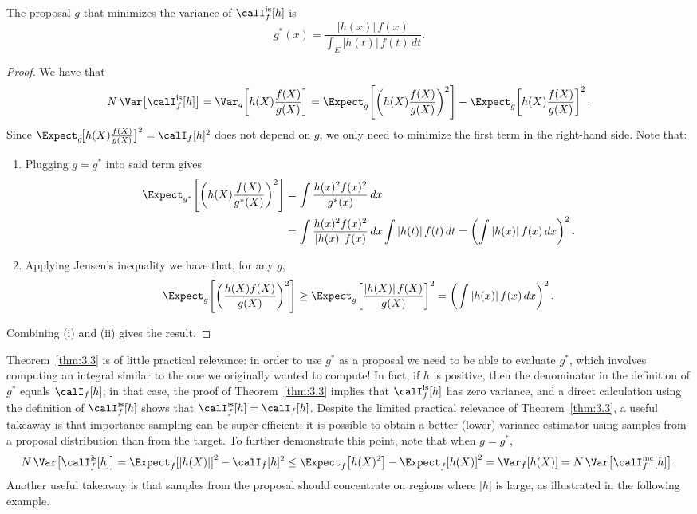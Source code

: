 \begin{theorem}
\label{thm:3.3}
The proposal $g$ that minimizes the variance of $\calI_f^{\mathrm{is}}[h]$ is
\[
  g^*(x) = \frac{|h(x)|\,f(x)}{\displaystyle\int_E |h(t)|\,f(t)\,dt}.
\]
\end{theorem}

\begin{proof}
We have that
\[
  N\,\Var\!\left[\calI_f^{\mathrm{is}}[h]\right]
  = \Var_g\!\left[h(X)\frac{f(X)}{g(X)}\right]
  = \Expect_g\!\left[\left(h(X)\frac{f(X)}{g(X)}\right)^2\right]
    - \Expect_g\!\left[h(X)\frac{f(X)}{g(X)}\right]^2.
\]
Since $\Expect_g\!\bigl[h(X)\tfrac{f(X)}{g(X)}\bigr]^2 = \calI_f[h]^2$ does
not depend on $g$, we only need to minimize the first term in the right-hand
side. Note that:

\begin{enumerate}[label=(\roman*)]
\item Plugging $g = g^*$ into said term gives
\begin{align*}
  \Expect_{g^*}\!\left[\left(h(X)\frac{f(X)}{g^*(X)}\right)^2\right]
  &= \int \frac{h(x)^2 f(x)^2}{g^*(x)}\,dx \\
  &= \int \frac{h(x)^2 f(x)^2}{|h(x)|\,f(x)}\,dx
     \int |h(t)|\,f(t)\,dt
   = \left(\int |h(x)|\,f(x)\,dx\right)^2.
\end{align*}

\item Applying Jensen's inequality we have that, for any $g$,
\[
  \Expect_g\!\left[\left(\frac{h(X)f(X)}{g(X)}\right)^2\right]
  \geq
  \Expect_g\!\left[\frac{|h(X)|\,f(X)}{g(X)}\right]^2
  = \left(\int |h(x)|\,f(x)\,dx\right)^2.
\]
\end{enumerate}
Combining (i) and (ii) gives the result.
\end{proof}

Theorem~\ref{thm:3.3} is of little practical relevance: in order to use $g^*$
as a proposal we need to be able to evaluate $g^*$, which involves computing an
integral similar to the one we originally wanted to compute! In fact, if $h$ is
positive, then the denominator in the definition of $g^*$ equals $\calI_f[h]$;
in that case, the proof of Theorem~\ref{thm:3.3} implies that
$\calI_f^{\mathrm{is}}[h]$ has zero variance, and a direct calculation using
the definition of $\calI_f^{\mathrm{is}}[h]$ shows that
$\calI_f^{\mathrm{is}}[h] = \calI_f[h]$. Despite the limited practical
relevance of Theorem~\ref{thm:3.3}, a useful takeaway is that importance
sampling can be super-efficient: it is possible to obtain a better (lower)
variance estimator using samples from a proposal distribution than from the
target. To further demonstrate this point, note that when $g = g^*$,
\[
  N\,\Var\!\left[\calI_f^{\mathrm{is}}[h]\right]
  = \Expect_f\!\left[|h(X)|\right]^2 - \calI_f[h]^2
  \leq \Expect_f\!\left[h(X)^2\right] - \Expect_f\!\left[h(X)\right]^2
  = \Var_f\!\left[h(X)\right]
  = N\,\Var\!\left[\calI_f^{\mathrm{mc}}[h]\right].
\]
Another useful takeaway is that samples from the proposal should concentrate on
regions where $|h|$ is large, as illustrated in the following example.

